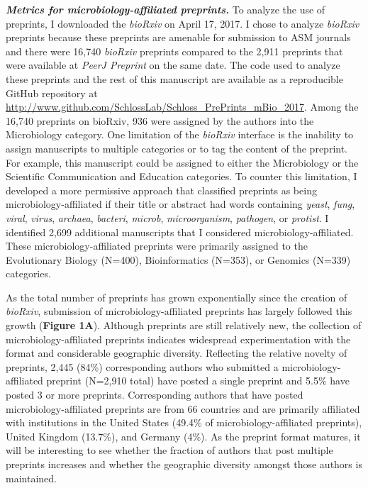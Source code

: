 \documentclass[11pt,]{article}
\begin{document}
\textbf{\emph{Metrics for microbiology-affiliated preprints.}} To
analyze the use of preprints, I downloaded the \emph{bioRxiv} on April
17, 2017. I chose to analyze \emph{bioRxiv} preprints because these
preprints are amenable for submission to ASM journals and there were
16,740 \emph{bioRxiv} preprints compared to the 2,911 preprints that
were available at \emph{PeerJ Preprint} on the same date. The code used
to analyze these preprints and the rest of this manuscript are available
as a reproducible GitHub repository at
\url{http://www.github.com/SchlossLab/Schloss_PrePrints_mBio_2017}.
Among the 16,740 preprints on bioRxiv, 936 were assigned by the authors
into the Microbiology category. One limitation of the \emph{bioRxiv}
interface is the inability to assign manuscripts to multiple categories
or to tag the content of the preprint. For example, this manuscript
could be assigned to either the Microbiology or the Scientific
Communication and Education categories. To counter this limitation, I
developed a more permissive approach that classified preprints as being
microbiology-affiliated if their title or abstract had words containing
\emph{yeast}, \emph{fung}, \emph{viral}, \emph{virus}, \emph{archaea},
\emph{bacteri}, \emph{microb}, \emph{microorganism}, \emph{pathogen}, or
\emph{protist}. I identified 2,699 additional manuscripts that I
considered microbiology-affiliated. These microbiology-affiliated
preprints were primarily assigned to the Evolutionary Biology (N=400),
Bioinformatics (N=353), or Genomics (N=339) categories.

As the total number of preprints has grown exponentially since the
creation of \emph{bioRxiv}, submission of microbiology-affiliated
preprints has largely followed this growth (\textbf{Figure 1A}).
Although preprints are still relatively new, the collection of
microbiology-affiliated preprints indicates widespread experimentation
with the format and considerable geographic diversity. Reflecting the
relative novelty of preprints, 2,445 (84\%) corresponding authors who
submitted a microbiology-affiliated preprint (N=2,910 total) have posted
a single preprint and 5.5\% have posted 3 or more preprints.
Corresponding authors that have posted microbiology-affiliated preprints
are from 66 countries and are primarily affiliated with institutions in
the United States (49.4\% of microbiology-affiliated preprints), United
Kingdom (13.7\%), and Germany (4\%). As the preprint format matures, it
will be interesting to see whether the fraction of authors that post
multiple preprints increases and whether the geographic diversity
amongst those authors is maintained.
\end{document}
